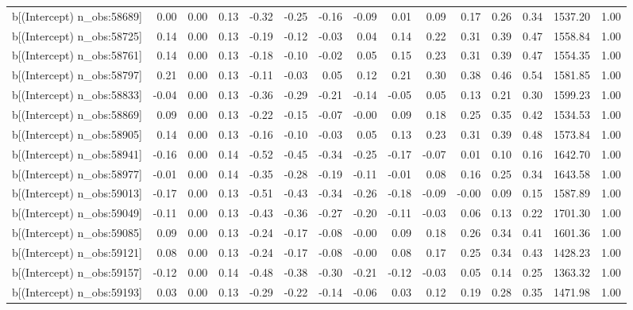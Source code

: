 \begin{table}[ht]
\begin{tabular}{rrrrrrrrrrrrrrr}
  b[(Intercept) n\_obs:58689] & 0.00 & 0.00 & 0.13 & -0.32 & -0.25 & -0.16 & -0.09 & 0.01 & 0.09 & 0.17 & 0.26 & 0.34 & 1537.20 & 1.00 \\ 
  b[(Intercept) n\_obs:58725] & 0.14 & 0.00 & 0.13 & -0.19 & -0.12 & -0.03 & 0.04 & 0.14 & 0.22 & 0.31 & 0.39 & 0.47 & 1558.84 & 1.00 \\ 
  b[(Intercept) n\_obs:58761] & 0.14 & 0.00 & 0.13 & -0.18 & -0.10 & -0.02 & 0.05 & 0.15 & 0.23 & 0.31 & 0.39 & 0.47 & 1554.35 & 1.00 \\ 
  b[(Intercept) n\_obs:58797] & 0.21 & 0.00 & 0.13 & -0.11 & -0.03 & 0.05 & 0.12 & 0.21 & 0.30 & 0.38 & 0.46 & 0.54 & 1581.85 & 1.00 \\ 
  b[(Intercept) n\_obs:58833] & -0.04 & 0.00 & 0.13 & -0.36 & -0.29 & -0.21 & -0.14 & -0.05 & 0.05 & 0.13 & 0.21 & 0.30 & 1599.23 & 1.00 \\ 
  b[(Intercept) n\_obs:58869] & 0.09 & 0.00 & 0.13 & -0.22 & -0.15 & -0.07 & -0.00 & 0.09 & 0.18 & 0.25 & 0.35 & 0.42 & 1534.53 & 1.00 \\ 
  b[(Intercept) n\_obs:58905] & 0.14 & 0.00 & 0.13 & -0.16 & -0.10 & -0.03 & 0.05 & 0.13 & 0.23 & 0.31 & 0.39 & 0.48 & 1573.84 & 1.00 \\ 
  b[(Intercept) n\_obs:58941] & -0.16 & 0.00 & 0.14 & -0.52 & -0.45 & -0.34 & -0.25 & -0.17 & -0.07 & 0.01 & 0.10 & 0.16 & 1642.70 & 1.00 \\ 
  b[(Intercept) n\_obs:58977] & -0.01 & 0.00 & 0.14 & -0.35 & -0.28 & -0.19 & -0.11 & -0.01 & 0.08 & 0.16 & 0.25 & 0.34 & 1643.58 & 1.00 \\ 
  b[(Intercept) n\_obs:59013] & -0.17 & 0.00 & 0.13 & -0.51 & -0.43 & -0.34 & -0.26 & -0.18 & -0.09 & -0.00 & 0.09 & 0.15 & 1587.89 & 1.00 \\ 
  b[(Intercept) n\_obs:59049] & -0.11 & 0.00 & 0.13 & -0.43 & -0.36 & -0.27 & -0.20 & -0.11 & -0.03 & 0.06 & 0.13 & 0.22 & 1701.30 & 1.00 \\ 
  b[(Intercept) n\_obs:59085] & 0.09 & 0.00 & 0.13 & -0.24 & -0.17 & -0.08 & -0.00 & 0.09 & 0.18 & 0.26 & 0.34 & 0.41 & 1601.36 & 1.00 \\ 
  b[(Intercept) n\_obs:59121] & 0.08 & 0.00 & 0.13 & -0.24 & -0.17 & -0.08 & -0.00 & 0.08 & 0.17 & 0.25 & 0.34 & 0.43 & 1428.23 & 1.00 \\ 
  b[(Intercept) n\_obs:59157] & -0.12 & 0.00 & 0.14 & -0.48 & -0.38 & -0.30 & -0.21 & -0.12 & -0.03 & 0.05 & 0.14 & 0.25 & 1363.32 & 1.00 \\ 
  b[(Intercept) n\_obs:59193] & 0.03 & 0.00 & 0.13 & -0.29 & -0.22 & -0.14 & -0.06 & 0.03 & 0.12 & 0.19 & 0.28 & 0.35 & 1471.98 & 1.00 \\ 

\end{tabular}
\end{table}
